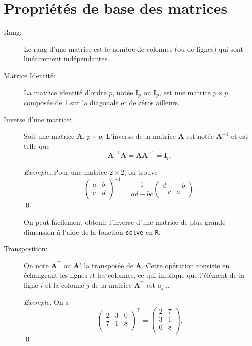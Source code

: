 \section{Propriétés de base des matrices}
\begin{description}
\item[Rang:] Le rang d'une matrice est le nombre de colonnes (ou de lignes) qui sont linéairement indépendantes.
\item[Matrice Identité:] La matrice identité d'ordre $p$, notée $\mathbf{I}_{p}$ ou $\mathbf{I}_{p}$, est une matrice $p\times p$ composée de 1 sur la diagonale et de zéros ailleurs.

\item[Inverse d'une matrice:] Soit une matrice $\mathbf{A}$, $p\times p$. L'inverse de la matrice $\mathbf{A}$ est notée $\mathbf{A}^{-1}$ et est telle que $$\mathbf{A}^{-1}\mathbf{A}=\mathbf{A}\mathbf{A}^{-1}=\mathbf{I}_{p}.$$

\emph{Exemple:}
Pour une matrice $2\times 2$, on trouve $$\begin{pmatrix} a & b \\ c& d\\ \end{pmatrix}^{-1}=\frac{1}{ad-bc}\begin{pmatrix} d & -b \\ -c& a\\ \end{pmatrix}.$$ \qed

On peut facilement obtenir l'inverse d'une matrice de plus grande dimension à l'aide de la fonction \verb'solve' en \verb'R'.

\item[Transposition:] On note $\mathbf{A}^{\top}$ ou $\mathbf{A}'$ la transposée de $\mathbf{A}$. Cette opération consiste en échangeant les lignes et les colonnes, ce qui implique que l'élément de la ligne $i$ et la colonne $j$ de la matrice $\mathbf{A}^{\top}$ est $a_{j,i}$.

\emph{Exemple:}
On a $$\begin{pmatrix} 2 & 3 & 0 \\ 7 & 1 & 8 \\ \end{pmatrix}^{\top}=\begin{pmatrix} 2 & 7 \\3 & 1 \\0 & 8 \\ \end{pmatrix}.$$ \qed


\end{description}

